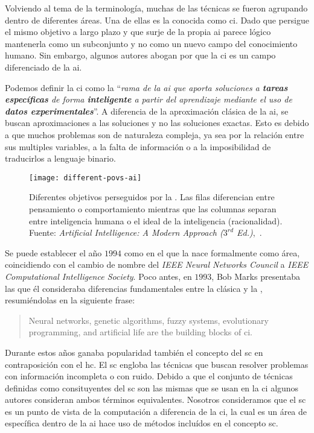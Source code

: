 Volviendo al tema de la terminología, muchas de las técnicas se fueron agrupando dentro de diferentes áreas. Una de ellas es la conocida como \acrlong{ci}. Dado que persigue el mismo objetivo a largo plazo y que surje de la propia \gls{ai} parece lógico mantenerla como un subconjunto y no como un nuevo campo del conocimiento humano. Sin embargo, algunos autores abogan por que la \gls{ci} es un campo diferenciado de la \gls{ai}.

Podemos definir la \acrlong{ci} como la \enquote{\textit{rama de la \gls{ai} que aporta soluciones a \textbf{tareas específicas} de forma \textbf{inteligente} a partir del aprendizaje mediante el uso de \textbf{datos experimentales}}}. A diferencia de la aproximación clásica de la \gls{ai}, se buscan aproximaciones a las soluciones y no las soluciones exactas. Esto es debido a que muchos problemas son de naturaleza compleja, ya sea por la relación entre sus multiples variables, a la falta de información o a la imposibilidad de traducirlos a lenguaje binario.

\begin{figure}
	\texttt{[image: different-povs-ai]}
	\caption[Diferentes objetivos perseguidos por la ]{Diferentes objetivos perseguidos por la . Las filas diferencian entre pensamiento o comportamiento mientras que las columnas separan entre inteligencia humana o el ideal de la inteligencia (racionalidad). Fuente: \textit{Artificial Intelligence: A Modern Approach ($3^{rd}$ Ed.)},~\cite{russell2003artificial}.}
	\label{fig:different-povs-ai}
\end{figure}

Se puede establecer el año $1994$ como en el que la  nace formalmente como área, coincidiendo con el cambio de nombre del \textit{IEEE Neural Networks Council} a \textit{IEEE Computational Intelligence Society}. Poco antes, en $1993$, Bob Marks presentaba las que él consideraba diferencias fundamentales entre la  clásica y la , resumiéndolas en la siguiente frase:

\blockquote{Neural networks, genetic algorithms, fuzzy systems, evolutionary programming, and artificial life are the building blocks of \ac{ci}.}

Durante estos años ganaba popularidad también el concepto del \gls{sc} en contraposición con el \gls{hc}. El \gls{sc} engloba las técnicas que buscan resolver problemas con información incompleta o con ruido. Debido a que el conjunto de técnicas definidas como consituyentes del \gls{sc} son las mismas que se usan en la \gls{ci} algunos autores consideran ambos términos equivalentes. Nosotros consideramos que el \gls{sc} es un punto de vista de la computación a diferencia de la \gls{ci}, la cual es un área de específica dentro de la \gls{ai} hace uso de métodos incluídos en el concepto \gls{sc}.

